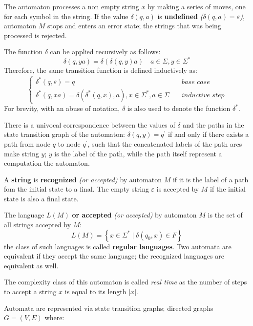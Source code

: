 \documentclass[english]{article}
\begin{document}
The automaton processes a non empty string \(x\) by making a series of moves, one for each symbol in the string.
If the value \(\delta(q, a)\) is \textbf{undefined} \textit{(\(\delta(q, a) = \varepsilon\))}, automaton \(M\) stops and enters an error state;
the strings that was being processed is rejected.

The function \(\delta\) can be applied recursively as follows:
\[ \delta(q, ya) = \delta \left(  \delta \left( q, y \right) a \right) \quad a \in \Sigma, y \in \Sigma^\ast \]
Therefore, the same transition function is defined inductively as:
\[\begin{cases}
    \delta^\ast\left( q, \varepsilon \right) = q \quad                                                                   & \textit{base case}      \\
    \delta^\ast\left( q, xa \right) = \delta \left( \delta^\ast (q, x), a \right), x \in \Sigma^\ast, a \in \Sigma \quad & \textit{inductive step}
  \end{cases}\]
For brevity, with an abuse of notation, \(\delta\) is also used to denote the function \(\delta^\ast\).

There is a univocal correspondence between the values of \(\delta\) and the paths in the state transition graph of the automaton: \(\delta(q, y) = q^\prime\) if and only if there exists a path from node \(q\) to node \(q^\prime\), such that the concatenated labels of the path arcs make string \(y\);
\(y\) is the label of the path, while the path itself represent a computation the automaton.

A \textbf{string} is \textbf{recognized} \textit{(or accepted)} by automaton \(M\) if it is the label of a path fom the initial state to a final.
The empty string \(\varepsilon\) is accepted by \(M\) if the initial state is also a final state.

The language \(L(M)\) \textbf{or accepted} \textit{(or accepted)} by automaton \(M\) is the set of all strings accepted by \(M\):
\[ L(M) = \left\{ x \in \Sigma^\ast \mid \delta(q_0, x) \in F \right\} \]
the class of such languages is called \textbf{regular languages}.
Two automata are equivalent if they accept the same language;
the recognized languages are equivalent as well.

The complexity class of this automaton is called \textit{real time} as the number of steps to accept a string \(x\) is equal to its length \(|x|\).

\bigskip
Automata are represented via state transition graphs; directed graphs \(G = (V, E)\) where:
\end{document}
